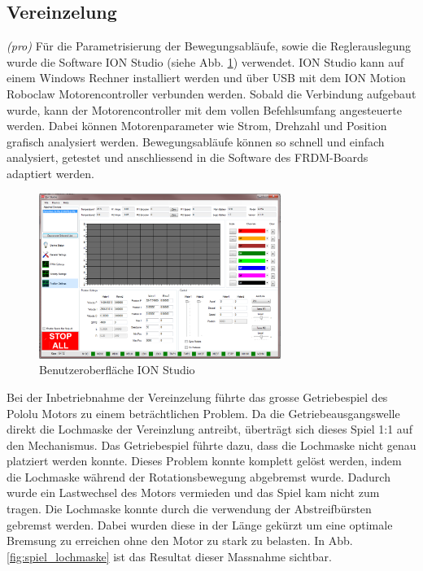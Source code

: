 \subsection{Vereinzelung} \label{sec:Inbetriebnahme_Vereinzelung}
\textit{(pro)} Für die Parametrisierung der Bewegungsabläufe, sowie die Reglerauslegung wurde die Software ION Studio (siehe Abb. \ref{fig:ION_Studio}) verwendet. ION Studio kann auf einem Windows Rechner installiert werden und über USB mit dem ION Motion Roboclaw Motorencontroller verbunden werden. Sobald die Verbindung aufgebaut wurde, kann der Motorencontroller mit dem vollen Befehlsumfang angesteuerte werden. Dabei können Motorenparameter wie Strom, Drehzahl und Position grafisch analysiert werden. Bewegungsabläufe können so schnell und einfach analysiert, getestet und anschliessend in die Software des FRDM-Boards adaptiert werden.

\begin{figure}[H]
	\includegraphics[width=0.7\textwidth]{Illustrationen/7-Inbetriebnahme_und_Kalibration/ION_Studio.png}
	\caption{Benutzeroberfläche ION Studio}
	\label{fig:ION_Studio}
\end{figure}

Bei der Inbetriebnahme der Vereinzelung führte das grosse Getriebespiel des Pololu Motors zu einem beträchtlichen Problem. Da die Getriebeausgangswelle direkt die Lochmaske der Vereinzlung antreibt, überträgt sich dieses Spiel 1:1 auf den Mechanismus. Das Getriebespiel führte dazu, dass die Lochmaske nicht genau platziert werden konnte. Dieses Problem konnte komplett gelöst werden, indem die Lochmaske während der Rotationsbewegung abgebremst wurde. Dadurch wurde ein Lastwechsel des Motors vermieden und das Spiel kam nicht zum tragen. Die Lochmaske konnte durch die verwendung der Abstreifbürsten gebremst werden. Dabei wurden diese in der Länge gekürzt um eine optimale Bremsung zu erreichen ohne den Motor zu stark zu belasten. In Abb. \ref{fig:spiel_lochmaske} ist das Resultat dieser Massnahme sichtbar.

